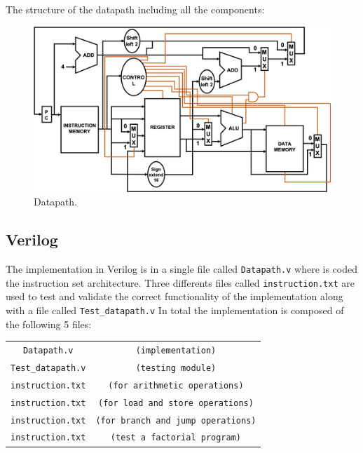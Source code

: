 \documentclass[conference]{IEEEtran}
\begin{document}
The structure of the datapath including all the components:
\begin{figure}[h]
\includegraphics[scale=0.27]{MIPS_Datapath.png}
\caption{Datapath.}
\end{figure}

\subsection{Verilog}
The implementation in Verilog is in a single file called \verb$Datapath.v$ where is coded the instruction set architecture. Three differents files called \verb$instruction.txt$ are used to test and validate the correct functionality of the implementation along with a file called \verb$Test_datapath.v$
In total the implementation is composed of the following 5 files:

\begin{table}[htbp]
\begin{center}
\begin{tabular}{c c}
\verb$Datapath.v$&\verb$(implementation)$\\
\verb$Test_datapath.v$&\verb$(testing module)$\\
\verb$instruction.txt$&\verb$(for arithmetic operations)$\\
\verb$instruction.txt$&\verb$(for load and store operations)$\\
\verb$instruction.txt$&\verb$(for branch and jump operations)$\\
\verb$instruction.txt$&\verb$(test a factorial program)$\\
\end{tabular}
\end{center}
\end{table}
\end{document}
